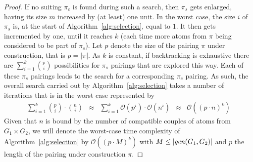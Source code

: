 \begin{proof}
	If no suiting $\pi_c$ is found during such a search, 
	then $\pi_s$ gets enlarged, having its size $m$ increased by (at least) one unit.
	In the worst case, the size $i$ of $\pi_s$ is, at the start of Algorithm~\ref{alg:selection}, equal to $1$. It then gets incremented by one, until it reaches $k$ (each time more atoms from $\pi$ being considered to be part of $\pi_s$). 
	Let $p$ denote the size of the pairing $\pi$ under construction, that is $p = |\pi|$. As $k$ is constant, if  backtracking is exhaustive there are $\sum\limits_{i=1}^{k} \binom{p}{i}$
	possibilities for $\pi_s$ pairings that are explored this way. Each of these $\pi_s$ pairings leads to the search for a corresponding $\pi_c$ pairing. As such, the overall search carried out by Algorithm~\ref{alg:selection} takes a number of iterations that is in the worst case represented by
	\[
	\begin{array}{lllll}
		\sum\limits_{i=1}^{k} \binom{p}{i}\cdot\binom{n}{i} & \approx & \sum\limits_{i=1}^{k} \mathcal{O}(p^i)\cdot\mathcal{O}(n^i) & \approx & \mathcal{O}((p\cdot n)^k)
	\end{array}
	\]
Given that $n$ is bound by the number of compatible couples of atoms from $G_1\times G_2$, we will denote the worst-case time complexity of Algorithm~\ref{alg:selection} by $\mathcal{O}((p\cdot M)^k)$ with $M \le |\mathit{gen}(G_1,G_2)|$ and $p$ the length of the pairing under construction $\pi$.
		
	

\end{proof}
